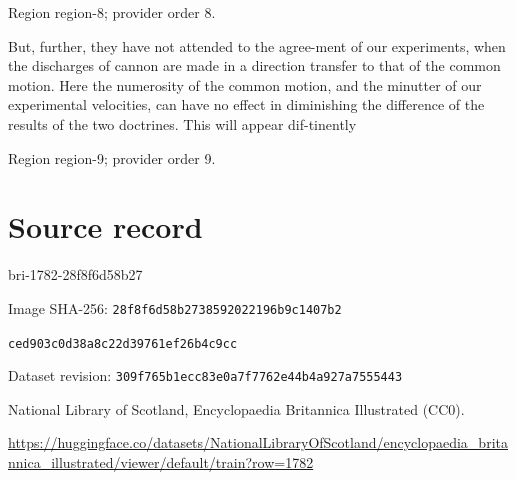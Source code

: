 \documentclass[11pt]{article}
\begin{document}
{\scriptsize\color{gray} Region region-8; provider order 8.\par}
\medskip

But, further, they have not attended to the agree-ment of our experiments, when the discharges of cannon are made in a direction transfer to that of the common motion. Here the numerosity of the common motion, and the minutter of our experimental velocities, can have no effect in diminishing the difference of the results of the two doctrines. This will appear dif-tinently
\par

{\scriptsize\color{gray} Region region-9; provider order 9.\par}
\medskip
\newpage\section*{Source record}
bri-1782-28f8f6d58b27\par
Image SHA-256: \texttt{28f8f6d58b2738592022196b9c1407b2}\par\texttt{ced903c0d38a8c22d39761ef26b4c9cc}\par
Dataset revision: \texttt{309f765b1ecc83e0a7f7}\texttt{762e44b4a927a7555443}\par
National Library of Scotland, Encyclopaedia Britannica Illustrated (CC0).\par
\url{https://huggingface.co/datasets/NationalLibraryOfScotland/encyclopaedia_britannica_illustrated/viewer/default/train?row=1782}
\end{document}
